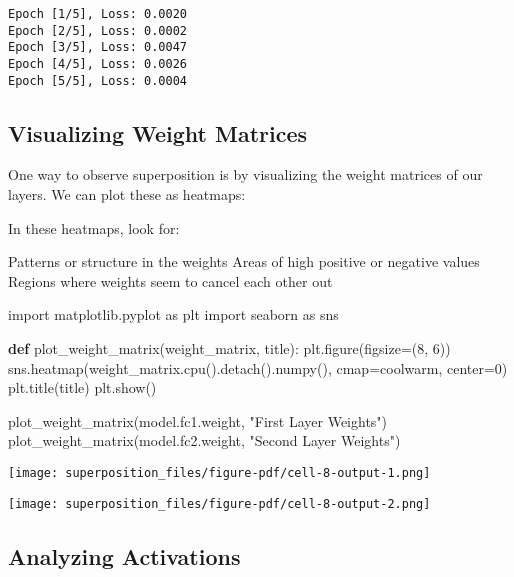 \documentclass[
  letterpaper,
  DIV=11,
  numbers=noendperiod]{scrreprt}
\newenvironment{Shaded}{\begin{snugshade}}{\end{snugshade}}
\newcommand{\DecValTok}[1]{\textcolor[rgb]{0.68,0.00,0.00}{#1}}
\newcommand{\ImportTok}[1]{\textcolor[rgb]{0.00,0.46,0.62}{#1}}
\newcommand{\KeywordTok}[1]{\textcolor[rgb]{0.00,0.23,0.31}{\textbf{#1}}}
\newcommand{\NormalTok}[1]{\textcolor[rgb]{0.00,0.23,0.31}{#1}}
\newcommand{\OperatorTok}[1]{\textcolor[rgb]{0.37,0.37,0.37}{#1}}
\newcommand{\StringTok}[1]{\textcolor[rgb]{0.13,0.47,0.30}{#1}}
\begin{document}
\begin{verbatim}
Epoch [1/5], Loss: 0.0020
Epoch [2/5], Loss: 0.0002
Epoch [3/5], Loss: 0.0047
Epoch [4/5], Loss: 0.0026
Epoch [5/5], Loss: 0.0004
\end{verbatim}

\subsection{Visualizing Weight
Matrices}\label{visualizing-weight-matrices}

One way to observe superposition is by visualizing the weight matrices
of our layers. We can plot these as heatmaps:

In these heatmaps, look for:

Patterns or structure in the weights Areas of high positive or negative
values Regions where weights seem to cancel each other out

\begin{Shaded}
\begin{Highlighting}[]
\ImportTok{import}\NormalTok{ matplotlib.pyplot }\ImportTok{as}\NormalTok{ plt}
\ImportTok{import}\NormalTok{ seaborn }\ImportTok{as}\NormalTok{ sns}

\KeywordTok{def}\NormalTok{ plot\_weight\_matrix(weight\_matrix, title):}
\NormalTok{    plt.figure(figsize}\OperatorTok{=}\NormalTok{(}\DecValTok{8}\NormalTok{, }\DecValTok{6}\NormalTok{))}
\NormalTok{    sns.heatmap(weight\_matrix.cpu().detach().numpy(), cmap}\OperatorTok{=}\StringTok{\textquotesingle{}coolwarm\textquotesingle{}}\NormalTok{, center}\OperatorTok{=}\DecValTok{0}\NormalTok{)}
\NormalTok{    plt.title(title)}
\NormalTok{    plt.show()}

\NormalTok{plot\_weight\_matrix(model.fc1.weight, }\StringTok{"First Layer Weights"}\NormalTok{)}
\NormalTok{plot\_weight\_matrix(model.fc2.weight, }\StringTok{"Second Layer Weights"}\NormalTok{)}
\end{Highlighting}
\end{Shaded}

\texttt{[image: superposition\_files/figure-pdf/cell-8-output-1.png]}

\texttt{[image: superposition\_files/figure-pdf/cell-8-output-2.png]}

\subsection{Analyzing Activations}\label{analyzing-activations}
\end{document}
